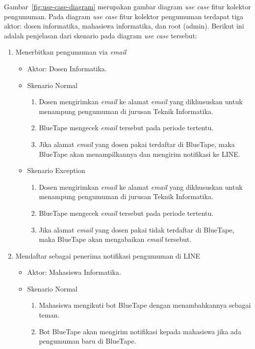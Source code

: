 Gambar~\ref{fig:use-case-diagram} merupakan gambar diagram \textit{use case} fitur kolektor pengumuman. Pada diagram \textit{use case} fitur kolektor pengumuman terdapat tiga aktor: dosen informatika, mahasiswa informatika, dan root (admin). Berikut ini adalah penjelasan dari skenario pada diagram \textit{use case} tersebut:
\begin{enumerate}
\item Menerbitkan pengumuman via \textit{email}

\begin{itemize}
	\item Aktor: Dosen Informatika.
	\item Skenario Normal

	\begin{enumerate}
		\item Dosen mengirimkan \textit{email} ke alamat \textit{email} yang dikhususkan untuk menampung pengumuman di jurusan Teknik Informatika.
		\item BlueTape mengecek \textit{email} tersebut pada periode tertentu.
		\item Jika alamat \textit{email} yang dosen pakai terdaftar di BlueTape, maka BlueTape akan menampilkannya dan mengirim notifikasi ke LINE.
	\end{enumerate}
	
	\item Skenario Exception
	\begin{enumerate}
		\item Dosen mengirimkan \textit{email} ke alamat \textit{email} yang dikhususkan untuk menampung pengumuman di jurusan Teknik Informatika.
		\item BlueTape mengecek \textit{email} tersebut pada periode tertentu.
		\item Jika alamat \textit{email} yang dosen pakai tidak terdaftar di BlueTape, maka BlueTape akan mengabaikan \textit{email} tersebut.
	\end{enumerate}
\end{itemize}

\item Mendaftar sebagai penerima notifikasi pengumuman di LINE

\begin{itemize}
	\item Aktor: Mahasiswa Informatika.
	\item Skenario Normal

	\begin{enumerate}
		\item Mahasiswa mengikuti bot BlueTape dengan menambahkannya sebagai teman.
		\item Bot BlueTape akan mengirim notifikasi kepada mahasiswa jika ada pengumuman baru di BlueTape.
	\end{enumerate}
\end{itemize}


\end{enumerate}
